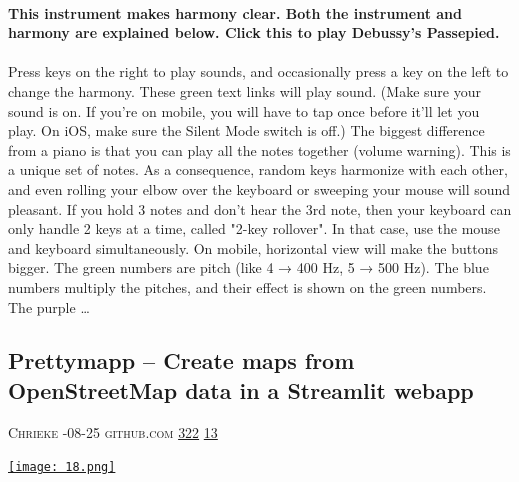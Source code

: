 \documentclass[10pt,a4paper]{article}
\begin{document}
\begin{multicols}{2}
\paragraph{}
\textbf{This instrument makes harmony clear. Both the instrument and harmony are explained below.
Click this to play Debussy's Passepied.}
\paragraph{}

Press keys on the right to play sounds, and occasionally press a key on the left to change the harmony. These green text links will play sound. (Make sure your sound is on. If you're on mobile, you will have to tap once before it'll let you play. On iOS, make sure the Silent Mode switch is off.)
The biggest difference from a piano is that you can play all the notes together (volume warning). This is a unique set of notes. As a consequence, random keys harmonize with each other, and even rolling your elbow over the keyboard or sweeping your mouse will sound pleasant. If you hold 3 notes and don't hear the 3rd note, then your keyboard can only handle 2 keys at a time, called "2-key rollover". In that case, use the mouse and keyboard simultaneously. On mobile, horizontal view will make the buttons bigger.
The green numbers are pitch (like 4 → 400 Hz, 5 → 500 Hz). The blue numbers multiply the pitches, and their effect is shown on the green numbers. The purple
\dots\par
\noindent\begin{minipage}{\linewidth}
\medskip
\subsection{Prettymapp – Create maps from OpenStreetMap data in a Streamlit webapp}
\textsc{\footnotesize
{\scriptsize\faUser}\space 
Chrieke 
{\scriptsize\faCalendar}-08-25 
{\scriptsize\faGithub}\space 
github.com 
{\scriptsize\faThumbsOUp}\space 
\href{http://news.ycombinator.com/item?id=37222823\&utm\_term=comment}{322} 
{\scriptsize\faComments}\space 
\href{http://news.ycombinator.com/item?id=37222823\&utm\_term=comment}{13} 
}
\par\medskip\noindent
\href{https://github.com/chrieke/prettymapp?utm\_source=hackernewsletter\&utm\_medium=email\&utm\_term=show\_hn}{
    \texttt{[image: 18.png]}
}
\end{minipage}

\end{multicols}
\end{document}
